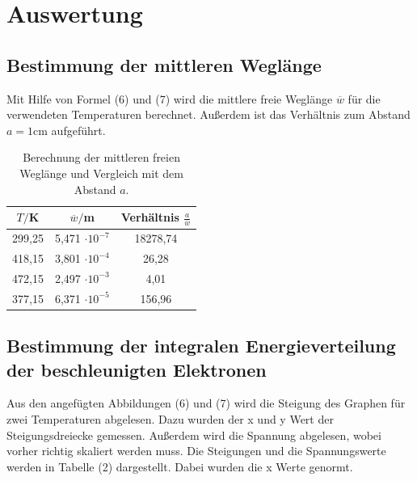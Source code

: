 
\section{Auswertung}
\label{sec:Auswertung}

\subsection{Bestimmung der mittleren Weglänge}
Mit Hilfe von Formel (6) und (7) wird die mittlere freie Weglänge $\overline{w}$ für die verwendeten Temperaturen berechnet. Außerdem ist das Verhältnis zum Abstand $a = 1 \si{\cm}$ aufgeführt.
\begin{table}[H]
  \centering
  \caption{Berechnung der mittleren freien Weglänge und Vergleich mit dem Abstand $a$.}
  \label{tab:Parameter}
  \begin{tabular}{c c c}
    \toprule
    $T/$K& $\overline{w}/$m  & Verhältnis $\frac{a}{\overline{w}}$ \\
    \bottomrule
    299,25 & 5,471 $\cdot 10^{-7}$ & 18278,74 \\
    418,15 & 3,801 $\cdot 10^{-4}$ & 26,28\\
    472,15 & 2,497 $\cdot 10^{-3}$ & 4,01\\
    377,15 & 6,371 $\cdot 10^{-5}$ & 156,96\\
     \bottomrule
  \end{tabular}
\end{table}


\subsection{Bestimmung der integralen Energieverteilung der beschleunigten Elektronen}

Aus den angefügten Abbildungen (6) und (7) wird die Steigung des Graphen für zwei Temperaturen abgelesen. 
Dazu wurden der x und y Wert der Steigungsdreiecke gemessen. Außerdem wird die Spannung abgelesen, wobei vorher richtig skaliert werden muss. Die Steigungen und die Spannungswerte werden in Tabelle (2) dargestellt.
Dabei wurden die x Werte genormt.

